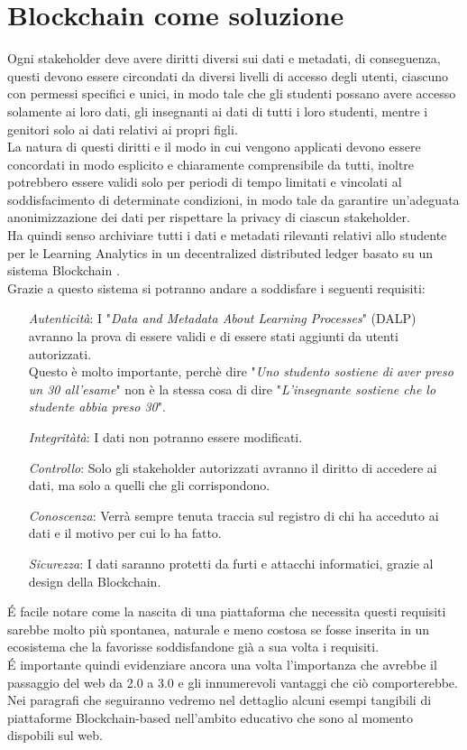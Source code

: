 \newpage
\section{Blockchain come soluzione}
Ogni stakeholder deve avere diritti diversi sui dati e metadati, 
di conseguenza, questi devono essere circondati da diversi livelli di accesso degli utenti, ciascuno con permessi specifici e unici,
in modo tale che gli studenti possano avere accesso solamente ai loro dati, gli insegnanti ai dati di tutti i loro studenti, mentre i genitori solo ai dati relativi ai propri figli.
\\La natura di questi diritti e il modo in cui vengono applicati devono essere concordati in modo esplicito e chiaramente comprensibile da tutti, 
inoltre potrebbero essere validi solo per periodi di tempo limitati e vincolati al soddisfacimento di determinate condizioni, in modo tale da garantire un'adeguata anonimizzazione dei dati per rispettare la privacy di ciascun stakeholder.
\\Ha quindi senso archiviare tutti i dati e metadati rilevanti relativi allo studente per le Learning Analytics in un decentralized distributed ledger basato su un sistema Blockchain \cite{Learning_Analytics_Privacy_on_the_Blockchain}.
\\Grazie a questo sistema si potranno andare a soddisfare i seguenti requisiti:
\begin{itemize}
    \item[\textit{Autenticità}:] I "\textit{Data and Metadata About Learning Processes}" (DALP) avranno la prova di essere validi e di essere stati aggiunti da utenti autorizzati. 
    \\Questo è molto importante, perchè dire "\textit{Uno studento sostiene di aver preso un 30 all'esame}" non è la stessa cosa di dire "\textit{L'insegnante sostiene che lo studente abbia preso 30}".
    \item[\textit{Integritàtà}:] I dati non potranno essere modificati.
    \item[\textit{Controllo}:] Solo gli stakeholder autorizzati avranno il diritto di accedere ai dati, ma solo a quelli che gli corrispondono. 
    \item[\textit{Conoscenza}:] Verrà sempre tenuta traccia sul registro di chi ha acceduto ai dati e il motivo per cui lo ha fatto.
    \item[\textit{Sicurezza}:] I dati saranno protetti da furti e attacchi informatici, grazie al design della Blockchain.
\end{itemize}
\'E facile notare come la nascita di una piattaforma che necessita questi requisiti sarebbe molto più spontanea, naturale e meno costosa se 
fosse inserita in un ecosistema che la favorisse soddisfandone già a sua volta i requisiti.
\\\'E importante quindi evidenziare ancora una volta l'importanza che avrebbe il passaggio del web da 2.0 a 3.0 e gli innumerevoli vantaggi che ciò comporterebbe.
\\Nei paragrafi che seguiranno vedremo nel dettaglio alcuni esempi tangibili di piattaforme Blockchain-based nell'ambito educativo che sono al momento dispobili sul web.

